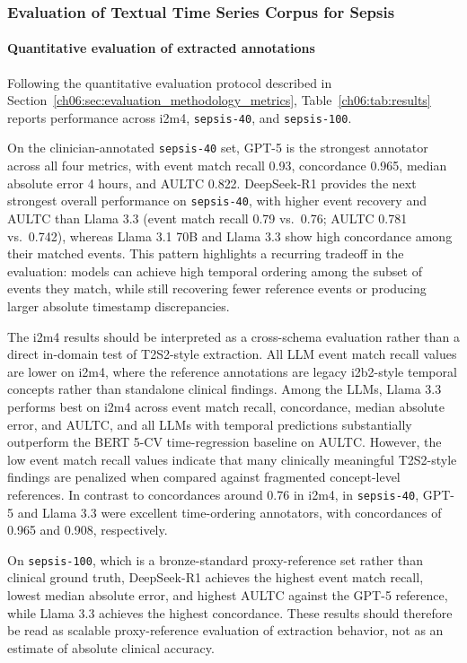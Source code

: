 \subsubsection{Evaluation of Textual Time Series Corpus for Sepsis}
\ChSixHeadingOnly
\paragraph{Quantitative evaluation of extracted annotations}
\label{ch06:sec:annotation_results_quantitative}
Following the quantitative evaluation protocol described in Section~\ref{ch06:sec:evaluation_methodology_metrics}, Table~\ref{ch06:tab:results} reports performance across i2m4, \texttt{sepsis-40}, and \texttt{sepsis-100}.


On the clinician-annotated \texttt{sepsis-40} set, GPT-5 is the strongest annotator across all four metrics, with event match recall 0.93, concordance 0.965, median absolute error 4 hours, and AULTC 0.822.
DeepSeek-R1 provides the next strongest overall performance on \texttt{sepsis-40}, with higher event recovery and AULTC than Llama 3.3 (event match recall 0.79 vs.\ 0.76; AULTC 0.781 vs.\ 0.742), whereas Llama 3.1 70B and Llama 3.3 show high concordance among their matched events.
This pattern highlights a recurring tradeoff in the evaluation: models can achieve high temporal ordering among the subset of events they match, while still recovering fewer reference events or producing larger absolute timestamp discrepancies.

The i2m4 results should be interpreted as a cross-schema evaluation rather than a direct in-domain test of T2S2-style extraction.
All LLM event match recall values are lower on i2m4, where the reference annotations are legacy i2b2-style temporal concepts rather than standalone clinical findings.
Among the LLMs, Llama 3.3 performs best on i2m4 across event match recall, concordance, median absolute error, and AULTC, and all LLMs with temporal predictions substantially outperform the BERT 5-CV time-regression baseline on AULTC.
However, the low event match recall values indicate that many clinically meaningful T2S2-style findings are penalized when compared against fragmented concept-level references.
In contrast to concordances around 0.76 in i2m4, in \texttt{sepsis-40}, GPT-5 and Llama 3.3 were excellent time-ordering annotators, with concordances of 0.965 and 0.908, respectively.

On \texttt{sepsis-100}, which is a bronze-standard proxy-reference set rather than clinical ground truth, DeepSeek-R1 achieves the highest event match recall, lowest median absolute error, and highest AULTC against the GPT-5 reference, while Llama 3.3 achieves the highest concordance.
These results should therefore be read as scalable proxy-reference evaluation of extraction behavior, not as an estimate of absolute clinical accuracy.

